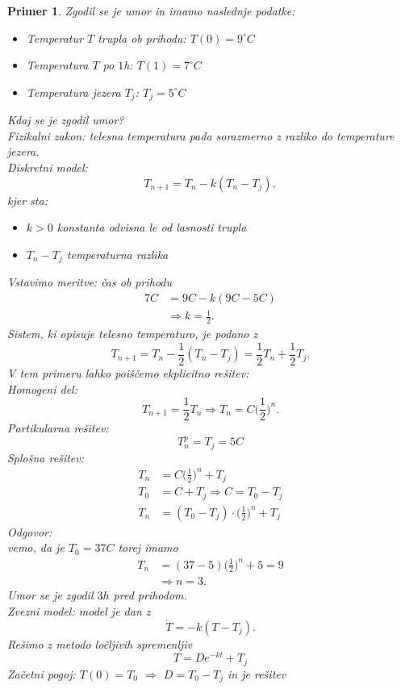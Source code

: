 \documentclass{article}
\newtheorem{primer}{Primer}
\begin{document}
\begin{primer}
Zgodil se je umor in imamo naslednje podatke:
\begin{itemize}
    \item Temperatur $T$ trupla ob prihodu: $T(0) = 9^\circ C$
    \item Temperatura $T$ po $1$h: $T(1) = 7^\circ C$
    \item Temperatura jezera $T_j$: $T_j = 5^\circ C$ 
\end{itemize}
Kdaj se je zgodil umor? \\
Fizikalni zakon: telesna temperatura pada sorazmerno z razliko do temperature jezera. \\
Diskretni model:
$$
T_{n+1} = T_n - k(T_n - T_j),
$$
kjer sta:
\begin{itemize}
\item $k>0$ konstanta odvisna le od lasnosti trupla
\item $T_n - T_j$ temperaturna razlika
\end{itemize}
Vstavimo meritve: čas ob prihodu
\begin{align*}
7C &= 9C - k(9C - 5C) \\ 
&\Longrightarrow k = \frac{1}{2}.
\end{align*}
Sistem, ki opisuje telesno temperaturo, je podano z 
$$
T_{n+1} = T_n - \frac{1}{2}(T_n - T_j) = \frac{1}{2}T_n + \frac{1}{2} T_j.
$$
\noindent
V tem primeru lahko poiščemo ekplicitno rešitev:\\ 
Homogeni del:
$$
T_{n+1} = \frac{1}{2} T_n \Longrightarrow T_n = C\Big(\frac{1}{2}\Big)^n.
$$
Partikularna rešitev:
$$
T_n^p = T_j = 5C
$$
Splošna rešitev:
\begin{align*}
T_n &= C\Big(\frac{1}{2}\Big)^n + T_j \\ 
T_0 &= C + T_j \Longrightarrow C = T_0 - T_j\\ 
T_n &= (T_0 - T_j)\cdot\Big(\frac{1}{2}\Big)^n + T_j
\end{align*}
Odgovor:\\ 
vemo, da je $T_0 = 37C$ torej imamo
\begin{align*}
T_n &= (37 - 5) \Big(\frac{1}{2}\Big)^n  + 5 = 9 \\ 
&\Longrightarrow n = 3.
\end{align*}
Umor se je zgodil $3h$ pred prihodom.\\ 
Zvezni model:
model je dan z
$$
\dot{T} = - k(T - T_j).
$$
Rešimo z metodo ločljivih spremenljiv
$$
T = D e^{-kt} + T_j
$$
Začetni pogoj: $T(0) = T_0$ $\Longrightarrow$ $D = T_0 - T_j$ in je rešitev

\end{primer}
\end{document}
